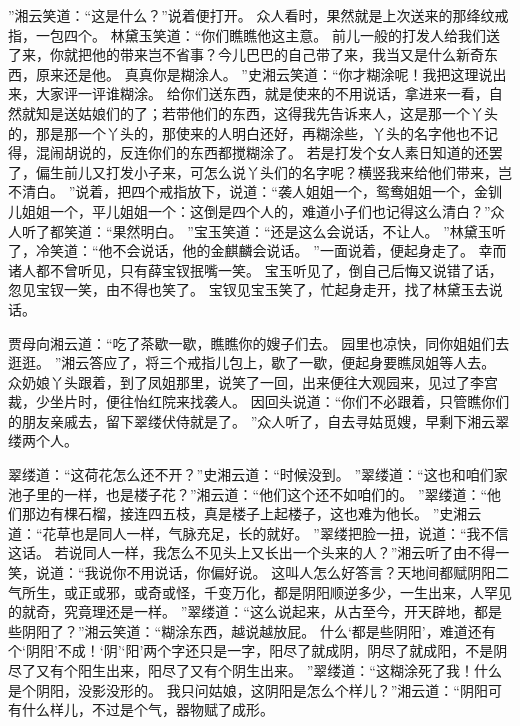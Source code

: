 ”湘云笑道：“这是什么？”说着便打开。
众人看时，果然就是上次送来的那绛纹戒指，一包四个。
林黛玉笑道：“你们瞧瞧他这主意。
前儿一般的打发人给我们送了来，你就把他的带来岂不省事？今儿巴巴的自己带了来，我当又是什么新奇东西，原来还是他。
真真你是糊涂人。
”史湘云笑道：“你才糊涂呢！我把这理说出来，大家评一评谁糊涂。
给你们送东西，就是使来的不用说话，拿进来一看，自然就知是送姑娘们的了；若带他们的东西，这得我先告诉来人，这是那一个丫头的，那是那一个丫头的，那使来的人明白还好，再糊涂些，丫头的名字他也不记得，混闹胡说的，反连你们的东西都搅糊涂了。
若是打发个女人素日知道的还罢了，偏生前儿又打发小子来，可怎么说丫头们的名字呢？横竖我来给他们带来，岂不清白。
”说着，把四个戒指放下，说道：“袭人姐姐一个，鸳鸯姐姐一个，金钏儿姐姐一个，平儿姐姐一个：这倒是四个人的，难道小子们也记得这么清白？”众人听了都笑道：“果然明白。
”宝玉笑道：“还是这么会说话，不让人。
”林黛玉听了，冷笑道：“他不会说话，他的金麒麟会说话。
”一面说着，便起身走了。
幸而诸人都不曾听见，只有薛宝钗抿嘴一笑。
宝玉听见了，倒自己后悔又说错了话，忽见宝钗一笑，由不得也笑了。
宝钗见宝玉笑了，忙起身走开，找了林黛玉去说话。
\par
贾母向湘云道：“吃了茶歇一歇，瞧瞧你的嫂子们去。
园里也凉快，同你姐姐们去逛逛。
”湘云答应了，将三个戒指儿包上，歇了一歇，便起身要瞧凤姐等人去。
众奶娘丫头跟着，到了凤姐那里，说笑了一回，出来便往大观园来，见过了李宫裁，少坐片时，便往怡红院来找袭人。
因回头说道：“你们不必跟着，只管瞧你们的朋友亲戚去，留下翠缕伏侍就是了。
”众人听了，自去寻姑觅嫂，早剩下湘云翠缕两个人。
\par
翠缕道：“这荷花怎么还不开？”史湘云道：“时候没到。
”翠缕道：“这也和咱们家池子里的一样，也是楼子花？”湘云道：“他们这个还不如咱们的。
”翠缕道：“他们那边有棵石榴，接连四五枝，真是楼子上起楼子，这也难为他长。
”史湘云道：“花草也是同人一样，气脉充足，长的就好。
”翠缕把脸一扭，说道：“我不信这话。
若说同人一样，我怎么不见头上又长出一个头来的人？”湘云听了由不得一笑，说道：“我说你不用说话，你偏好说。
这叫人怎么好答言？天地间都赋阴阳二气所生，或正或邪，或奇或怪，千变万化，都是阴阳顺逆多少，一生出来，人罕见的就奇，究竟理还是一样。
”翠缕道：“这么说起来，从古至今，开天辟地，都是些阴阳了？”湘云笑道：“糊涂东西，越说越放屁。
什么‘都是些阴阳’，难道还有个‘阴阳’不成！‘阴’‘阳’两个字还只是一字，阳尽了就成阴，阴尽了就成阳，不是阴尽了又有个阳生出来，阳尽了又有个阴生出来。
”翠缕道：“这糊涂死了我！什么是个阴阳，没影没形的。
我只问姑娘，这阴阳是怎么个样儿？”湘云道：“阴阳可有什么样儿，不过是个气，器物赋了成形。
